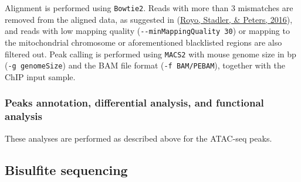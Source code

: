 \documentclass[12pt,twoside]{reedthesis}
\begin{document}
Alignment is performed using \texttt{Bowtie2}. Reads with more than 3
mismatches are removed from the aligned data, as suggested in
(\protect\hyperlink{ref-royo2016}{Royo, Stadler, \& Peters, 2016}), and reads with low mapping quality (\texttt{-\/-minMappingQuality\ 30})
or mapping to the mitochondrial chromosome or aforementioned blacklisted
regions are also filtered out. Peak calling is performed using \texttt{MACS2}
with mouse genome size in bp (\texttt{-g\ genomeSize}) and the BAM file
format (\texttt{-f\ BAM/PEBAM}), together with the ChIP input sample.

\hypertarget{m3.4.2}{%
\subsubsection*{Peaks annotation, differential analysis, and functional analysis}\label{m3.4.2}}

These analyses are performed as described above for the ATAC-seq peaks.

\hypertarget{m3.5}{%
\subsection*{Bisulfite sequencing}\label{m3.5}}
\end{document}
